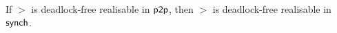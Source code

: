 


\begin{theorem}\label{thm:pp-realizability-implies-synch-realizability}
    If $\gt$ is deadlock-free realisable in $\mathsf{p2p}$, then $\gt$ is deadlock-free realisable in $\mathsf{synch}$.
\end{theorem}

